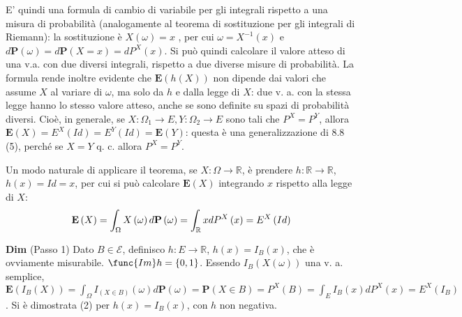 \documentclass{article}
\begin{document}
E' quindi una formula di cambio di variabile per gli integrali rispetto a
una misura di probabilit\`{a} (analogamente al teorema di sostituzione per
gli integrali di Riemann): la sostituzione \`{e} $X\left( \omega \right) =x$%
, per cui $\omega =X^{-1}\left( x\right) $ e $d\mathbf{P}\left( \omega
\right) =d\mathbf{P}\left( X=x\right) =dP^{X}\left( x\right) $. Si pu\`{o}
quindi calcolare il valore atteso di una v.a. con due diversi integrali,
rispetto a due diverse misure di probabilit\`{a}. La formula rende inoltre
evidente che $\mathbf{E}\left( h\left( X\right) \right) $ non dipende dai
valori che assume $X$ al variare di $\omega $, ma solo da $h$ e dalla legge
di $X$: due v. a. con la stessa legge hanno lo stesso valore atteso, anche
se sono definite su spazi di probabilit\`{a} diversi. Cio\`{e}, in generale,
se $X:\Omega _{1}\rightarrow E,Y:\Omega _{2}\rightarrow E$ sono tali che $%
P^{X}=P^{Y}$, allora $\mathbf{E}\left( X\right) =E^{X}\left( Id\right)
=E^{Y}\left( Id\right) =\mathbf{E}\left( Y\right) $: questa \`{e} una
generalizzazione di 8.8 (5), perch\'{e} se $X=Y$ q. c. allora $P^{X}=P^{Y}$.

Un modo naturale di applicare il teorema, se $X:\Omega \rightarrow 
\mathbb{R}
$, \`{e} prendere $h:%
\mathbb{R}
\rightarrow 
\mathbb{R}
$, $h\left( x\right) =Id=x$, per cui si
pu\`{o} calcolare $\mathbf{E}\left( X\right) $ integrando $x$ rispetto alla
legge di $X$: 
\begin{equation*}
\mathbf{E}\left( X\right) =\int_{\Omega }X\left( \omega \right) d\mathbf{P}%
\left( \omega \right) =\int_{%
\mathbb{R}
}xdP^{X}\left( x\right) =E^{X}\left( Id\right)
\end{equation*}

\textbf{Dim} (Passo 1) Dato $B\in \mathcal{E}$, definisco $h:E\rightarrow 
\mathbb{R}
$, $h\left( x\right) =I_{B}\left( x\right) $, che \`{e} ovviamente
misurabile. $\func{Im}h=\left\{ 0,1\right\} $. Essendo $I_{B}\left( X\left(
\omega \right) \right) $ una v. a. semplice, $\mathbf{E}\left( I_{B}\left(
X\right) \right) =\int_{\Omega }I_{\left( X\in B\right) }\left( \omega
\right) d\mathbf{P}\left( \omega \right) =\mathbf{P}\left( X\in B\right)
=P^{X}\left( B\right) =\int_{E}I_{B}\left( x\right) dP^{X}\left( x\right)
=E^{X}\left( I_{B}\right) $. Si \`{e} dimostrata (2) per $h\left( x\right)
=I_{B}\left( x\right) $, con $h$ non negativa.
\end{document}
